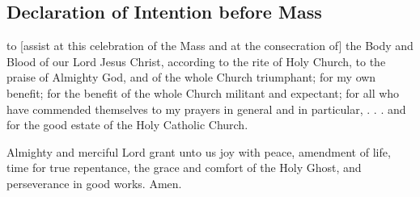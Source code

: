 \subsection{Declaration of Intention before Mass}
 to [assist at this celebration of the Mass and at the consecration of] the Body and Blood of our Lord Jesus Christ, according to the rite of Holy Church, to the praise of Almighty God, and of the whole Church triumphant; for my own benefit; for the benefit of the whole Church militant and expectant; for all who have commended themselves to my prayers in general and in particular,  . . . and for the good estate of the Holy Catholic Church.
\par
%
 Almighty and merciful Lord grant unto us joy with peace, amendment of life, time for true repentance, the grace and comfort of the Holy Ghost, and perseverance in good works. Amen.


